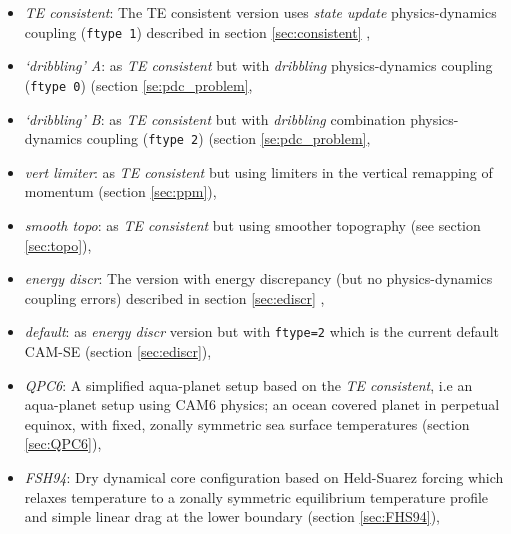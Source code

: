 \documentclass[draft,linenumbers]{agujournal}
\begin{document}
\begin{itemize}
\item {\em{TE consistent}}: The TE consistent version uses {\em{state update}} physics-dynamics coupling ({\tt{ftype 1}}) described in section \ref{sec:consistent} {\color{red}{(this configuration does not have PDC errors and it has the same TE definition in physics and dynamics; and hence the energetically most consistent setup in terms of least number TE error terms)}},
\item {\em{`dribbling' A}}: as {\em{TE consistent}} but with {\em{dribbling}} physics-dynamics coupling ({\tt{ftype 0}}) (section \ref{se:pdc_problem}{\color{red}{; this setup is used to assess PDC errors)}},
\item {\em{`dribbling' B}}: as {\em{TE consistent}} but with  {\em{dribbling}} combination physics-dynamics coupling ({\tt{ftype 2}}) (section \ref{se:pdc_problem}{\color{red}{; this setup is used to assess PDC errors)}},
\item {\em{vert limiter}}: as {\em{TE consistent}} but using limiters in the vertical remapping of momentum (section \ref{sec:ppm}{\color{red}{; experiment is used to assess TE errors associated with shape-preserving limiters in vertical remapping}}),
\item {\em{smooth topo}}: as {\em{TE consistent}} but  using smoother topography (see section \ref{sec:topo}{\color{red}{; experiment is used to assess TE sensitivity to surface roughness}}),
\item {\em{energy discr}}: The version with energy discrepancy (but no physics-dynamics coupling errors) described in section \ref{sec:ediscr} {\color{red}{(experiment is used to estimate energy discrepancy errors)}},
\item {\em{default}}: as {\em{energy discr}} version but with {\tt{ftype=2}} which is the current default CAM-SE (section \ref{sec:ediscr}{\color{red}{; we assess this configuration since it is the default CAM-SE configuration}}),
\item {\em{QPC6}}: A simplified aqua-planet setup based on the {\em{TE consistent}}, i.e an aqua-planet setup using CAM6 physics; an ocean covered planet in perpetual equinox, with fixed, zonally symmetric sea surface temperatures \citep{NH2000ASL,MWO2016JAMES} (section \ref{sec:QPC6}{\color{red}{; experiment is used to assess TE errors in a simplified moist environment}}), 
\item {\em{FSH94}}: Dry dynamical core configuration based on Held-Suarez forcing which relaxes temperature to a zonally symmetric equilibrium temperature profile and simple linear drag at the lower boundary \citep{HS1994BAMS} (section \ref{sec:FHS94}{\color{red}{; experiment is used to assess if TE errors in one of the simplest climate test cases is representative of full model TE errors}}), 

\end{itemize}
\end{document}
